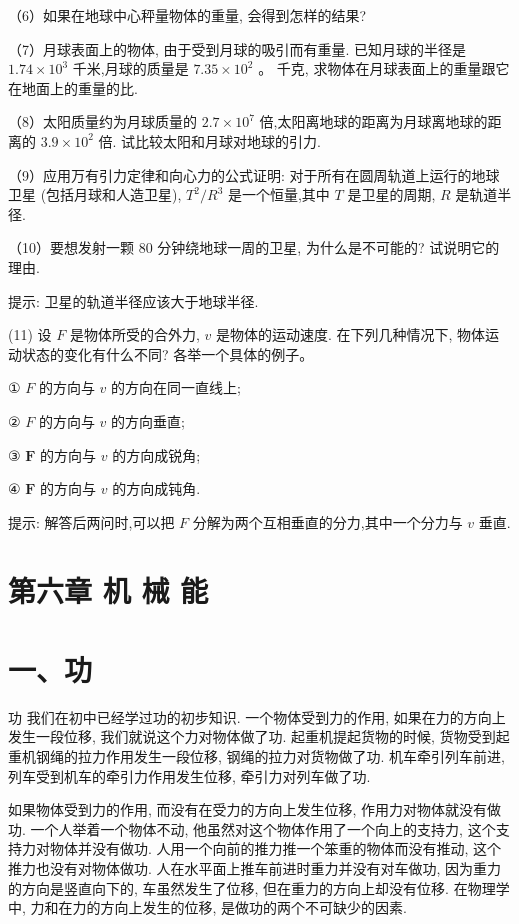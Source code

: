 \documentclass[10pt]{article}
\begin{document}
（6）如果在地球中心秤量物体的重量, 会得到怎样的结果?

（7）月球表面上的物体, 由于受到月球的吸引而有重量. 已知月球的半径是 \({1.74} \times {10}^{3}\) 千米,月球的质量是 \({7.35} \times {10}^{2}\) 。 千克, 求物体在月球表面上的重量跟它在地面上的重量的比.

（8）太阳质量约为月球质量的 \({2.7} \times {10}^{7}\) 倍,太阳离地球的距离为月球离地球的距离的 \({3.9} \times {10}^{2}\) 倍. 试比较太阳和月球对地球的引力.

（9）应用万有引力定律和向心力的公式证明: 对于所有在圆周轨道上运行的地球卫星 (包括月球和人造卫星), \({T}^{2}/{R}^{3}\) 是一个恒量,其中 \(T\) 是卫星的周期, \(R\) 是轨道半径.

（10）要想发射一颗 80 分钟绕地球一周的卫星, 为什么是不可能的? 试说明它的理由.

提示: 卫星的轨道半径应该大于地球半径.

(11) 设 \(F\) 是物体所受的合外力, \(v\) 是物体的运动速度. 在下列几种情况下, 物体运动状态的变化有什么不同? 各举一个具体的例子。

① \(F\) 的方向与 \(v\) 的方向在同一直线上;

② \(F\) 的方向与 \(v\) 的方向垂直;

③ \(\mathbf{F}\) 的方向与 \(v\) 的方向成锐角;

④ \(\mathbf{F}\) 的方向与 \(v\) 的方向成钝角.

提示: 解答后两问时,可以把 \(F\) 分解为两个互相垂直的分力,其中一个分力与 \(v\) 垂直.

\section*{第六章 机 械 能}

\section*{一、功}

功 我们在初中已经学过功的初步知识. 一个物体受到力的作用, 如果在力的方向上发生一段位移, 我们就说这个力对物体做了功. 起重机提起货物的时候, 货物受到起重机钢绳的拉力作用发生一段位移, 钢绳的拉力对货物做了功. 机车牵引列车前进, 列车受到机车的牵引力作用发生位移, 牵引力对列车做了功.

如果物体受到力的作用, 而没有在受力的方向上发生位移, 作用力对物体就没有做功. 一个人举着一个物体不动, 他虽然对这个物体作用了一个向上的支持力, 这个支持力对物体并没有做功. 人用一个向前的推力推一个笨重的物体而没有推动, 这个推力也没有对物体做功. 人在水平面上推车前进时重力并没有对车做功, 因为重力的方向是竖直向下的, 车虽然发生了位移, 但在重力的方向上却没有位移. 在物理学中, 力和在力的方向上发生的位移, 是做功的两个不可缺少的因素.
\end{document}

